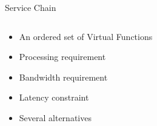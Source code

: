 \begin{frame}{Service Chain}
\begin{columns}
\begin{column}{.6\textwidth}
\begin{itemize}[<+>]
  \item An ordered set of Virtual Functions
  \item Processing requirement
  \item Bandwidth requirement
  \item Latency constraint
  \item Several alternatives
\end{itemize}
\end{column}
\begin{column}{.4\textwidth}
\begin{center}

\end{center}
\end{column}
\end{columns}
\end{frame}
